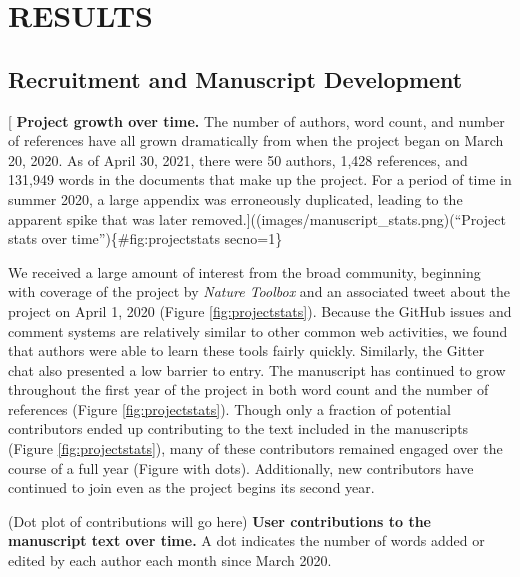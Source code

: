 \documentclass[twocolumn]{ceurart}
\begin{document}
\hypertarget{results}{%
\section{RESULTS}\label{results}}

\hypertarget{recruitment-and-manuscript-development}{%
\subsection{Recruitment and Manuscript Development}\label{recruitment-and-manuscript-development}}

{[}
\textbf{Project growth over time.}
The number of authors, word count, and number of references have all grown dramatically from when the project began on March 20, 2020.
As of April 30, 2021, there were 50 authors, 1,428 references, and 131,949 words in the documents that make up the project.
For a period of time in summer 2020, a large appendix was erroneously duplicated, leading to the apparent spike that was later removed.{]}((images/manuscript\_stats.png)(``Project stats over time'')\{\#fig:projectstats secno=1\}

We received a large amount of interest from the broad community, beginning with coverage of the project by \emph{Nature Toolbox} \citep{AE0QcVgJ} and an associated tweet about the project on April 1, 2020 \citep{Ygqb6P2w} (Figure \ref{fig:projectstats}).
Because the GitHub issues and comment systems are relatively similar to other common web activities, we found that authors were able to learn these tools fairly quickly.
Similarly, the Gitter chat also presented a low barrier to entry.
The manuscript has continued to grow throughout the first year of the project in both word count and the number of references (Figure \ref{fig:projectstats}).
Though only a fraction of potential contributors ended up contributing to the text included in the manuscripts (Figure \ref{fig:projectstats}), many of these contributors remained engaged over the course of a full year (Figure with dots).
Additionally, new contributors have continued to join even as the project begins its second year.

(Dot plot of contributions will go here)
\textbf{User contributions to the manuscript text over time.}
A dot indicates the number of words added or edited by each author each month since March 2020.
\end{document}
